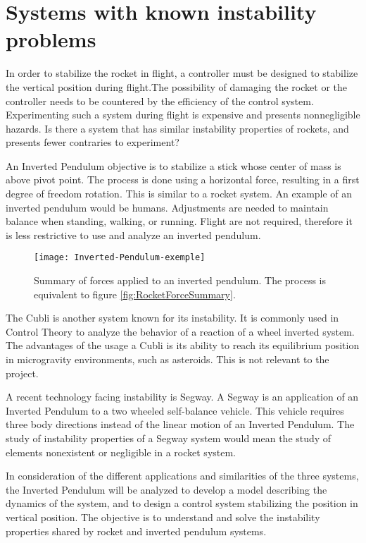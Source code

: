 \section{Systems with known instability problems}
\graphicspath{{figures/"Preanalysis&Requirement"/SimilarSystems/}}
In order to stabilize the rocket in flight, a controller must be designed to stabilize the vertical position during flight.The possibility of damaging the rocket or the controller needs to be countered by the efficiency of the control system. Experimenting such a system during flight is expensive and presents nonnegligible hazards.
Is there a system that has similar instability properties of rockets, and presents fewer contraries to experiment?

An Inverted Pendulum objective is to stabilize a stick whose center of mass is above pivot point. The process is done using a horizontal force, resulting in a first degree of freedom rotation. This is similar to a rocket system. An example of an inverted pendulum would be humans. Adjustments are needed to maintain balance when standing, walking, or running. Flight are not required, therefore it is less restrictive to use and analyze an inverted pendulum.

\begin{figure}[htbp]
	\centering
	\texttt{[image: Inverted-Pendulum-exemple]}
	\caption{Summary of forces applied to an inverted pendulum. The process is equivalent to figure  \vref{fig:RocketForceSummary}.}
	\label{fig:InvertedPendulum}
\end{figure}


The Cubli is another system known for its instability. It is commonly used in Control Theory to analyze the behavior of a reaction of a wheel inverted system. The advantages of the usage a Cubli is its ability to reach its equilibrium position in microgravity environments, such as asteroids. This is not relevant to the project.

A recent technology facing instability is Segway. A Segway is an application of an Inverted Pendulum to a two wheeled self-balance vehicle. This vehicle requires three body directions instead of the linear motion of an Inverted Pendulum. The study of instability properties of a Segway system would mean the study of elements nonexistent or negligible in a rocket system.

In consideration of the different applications and similarities of the three systems, the Inverted Pendulum will be analyzed to develop a model describing the dynamics of the system, and to design a control system stabilizing the position in vertical position. The objective is to understand and solve the instability properties shared by rocket and inverted pendulum systems.


